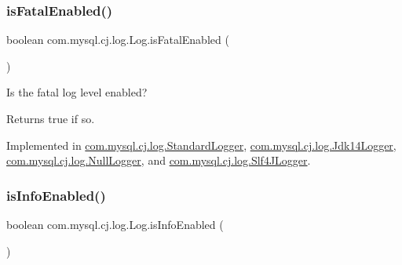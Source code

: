 \mbox{\label{interfacecom_1_1mysql_1_1cj_1_1log_1_1_log_a61464d2603e609442da19c59c5c62f62}} 
\subsubsection{\texorpdfstring{is\+Fatal\+Enabled()}{isFatalEnabled()}}
{\footnotesize\ttfamily boolean com.\+mysql.\+cj.\+log.\+Log.\+is\+Fatal\+Enabled (\begin{DoxyParamCaption}{ }\end{DoxyParamCaption})}

Is the \textquotesingle{}fatal\textquotesingle{} log level enabled?

\begin{DoxyReturn}{Returns}
true if so. 
\end{DoxyReturn}


Implemented in \mbox{\hyperlink{classcom_1_1mysql_1_1cj_1_1log_1_1_standard_logger_a622ab5114bddae2c0893a08e53c66cff}{com.\+mysql.\+cj.\+log.\+Standard\+Logger}}, \mbox{\hyperlink{classcom_1_1mysql_1_1cj_1_1log_1_1_jdk14_logger_af740a8480a6f4332aca8118b1143f311}{com.\+mysql.\+cj.\+log.\+Jdk14\+Logger}}, \mbox{\hyperlink{classcom_1_1mysql_1_1cj_1_1log_1_1_null_logger_a70814db9a009e9da80bc67c4e084120c}{com.\+mysql.\+cj.\+log.\+Null\+Logger}}, and \mbox{\hyperlink{classcom_1_1mysql_1_1cj_1_1log_1_1_slf4_j_logger_ae5ee0af225f5bc993dc023b8b31de983}{com.\+mysql.\+cj.\+log.\+Slf4\+J\+Logger}}.

\mbox{\label{interfacecom_1_1mysql_1_1cj_1_1log_1_1_log_aecb7f781b61b516d6bad9ada8e7dd3aa}} 
\subsubsection{\texorpdfstring{is\+Info\+Enabled()}{isInfoEnabled()}}
{\footnotesize\ttfamily boolean com.\+mysql.\+cj.\+log.\+Log.\+is\+Info\+Enabled (\begin{DoxyParamCaption}{ }\end{DoxyParamCaption})}

